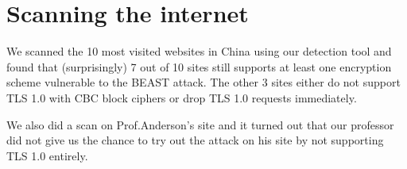 \documentclass{acm_proc_article-sp}
\begin{document}
\section{Scanning the internet}
We scanned the 10 most visited websites in China using our detection tool and found that
(surprisingly) 7 out of 10 sites still supports at least one encryption scheme vulnerable to the BEAST
attack. The other 3 sites either do not support TLS 1.0 with CBC block ciphers or drop TLS 1.0
requests immediately.

We also did a scan on Prof.Anderson's site and it turned out that our professor did not give us the
chance to try out the attack on his site by not supporting TLS 1.0 entirely.


\balancecolumns
\end{document}
